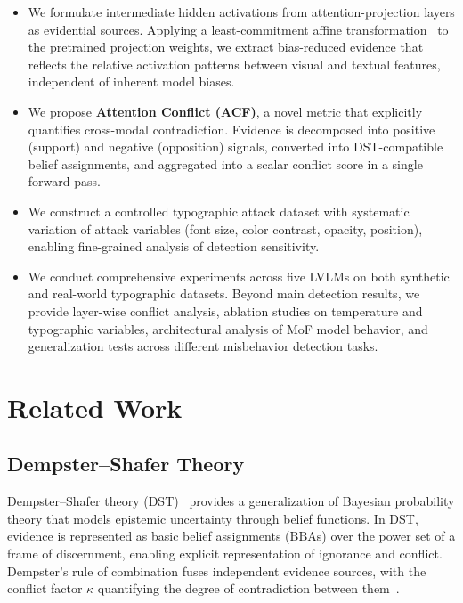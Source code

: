 \documentclass[preprint,12pt]{elsarticle}
\begin{document}
\begin{itemize}[leftmargin=*]
    \item We formulate intermediate hidden activations from attention-projection layers as evidential sources. Applying a least-commitment affine transformation~\cite{smets1993belief} to the pretrained projection weights, we extract bias-reduced evidence that reflects the relative activation patterns between visual and textual features, independent of inherent model biases.
    \item We propose \textbf{Attention Conflict (ACF)}, a novel metric that explicitly quantifies cross-modal contradiction. Evidence is decomposed into positive (support) and negative (opposition) signals, converted into DST-compatible belief assignments, and aggregated into a scalar conflict score in a single forward pass.
    \item We construct a controlled typographic attack dataset with systematic variation of attack variables (font size, color contrast, opacity, position), enabling fine-grained analysis of detection sensitivity.
    \item We conduct comprehensive experiments across five LVLMs on both synthetic and real-world typographic datasets. Beyond main detection results, we provide layer-wise conflict analysis, ablation studies on temperature and typographic variables, architectural analysis of MoF model behavior, and generalization tests across different misbehavior detection tasks.
\end{itemize}

\section{Related Work}

\subsection{Dempster--Shafer Theory}

Dempster--Shafer theory (DST)~\cite{shafer1976theory,dempster1967upper} provides a generalization of Bayesian probability theory that models epistemic uncertainty through belief functions. In DST, evidence is represented as basic belief assignments (BBAs) over the power set of a frame of discernment, enabling explicit representation of ignorance and conflict. Dempster's rule of combination fuses independent evidence sources, with the conflict factor $\kappa$ quantifying the degree of contradiction between them~\cite{smets1993belief}.
\end{document}
